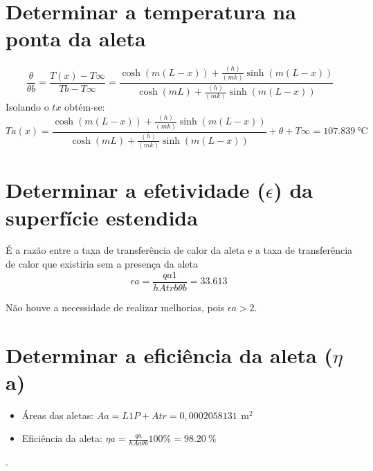 \section{Determinar a temperatura na ponta da aleta}\label{sec:C}
\begin{equation}
    {\frac{\theta}{{\theta}b}}=
    {\frac
    {T(x)-{T\infty}}
    {Tb-{T\infty}}
    }=
    {
    \frac
    {\cosh{(m(L-x))}+{\frac{(h)}{(mk)}}{\sinh{(m(L-x))}}}
    {\cosh{(mL)}+{\frac{(h)}{(mk)}}{\sinh{(m(L-x))}}}
    }
\end{equation}
Isolando o \(tx\) obtém-se:
\begin{equation}
    {Ta(x)}=
    {
    \frac
    {\cosh{(m(L-x))}+{\frac{(h)}{(mk)}}{\sinh{(m(L-x))}}}
    {\cosh{(mL)}+{\frac{(h)}{(mk)}}{\sinh{(m(L-x))}}}
    }+
    {\theta}+
    {T\infty}=
    \SI{107,839}{\degreeCelsius}
\end{equation}

\section{ Determinar a efetividade (\(\epsilon\)) da superfície estendida}\label{sec:d}
É a razão entre a taxa de transferência de calor da aleta e a taxa de
transferência de calor que existiria sem a presença da aleta
\begin{equation}
    {{\epsilon}a}=
        {
            \frac
            {{qa1}}
            {{h}{Atrb}{\theta}b}
        }=
        {\SI{33,613}{}}
\end{equation}
\par Não houve a necessidade de realizar melhorias, pois \({\epsilon}a>{2}\).

\section{Determinar a eficiência da aleta (\(\eta\)a)}\label{sec:e}

\begin{itemize}[leftmargin=2cm]
    \item Áreas das aletas: \(
          {Aa}={{L1}{P}+{Atr}} = 0,0002058131\,\SI{}{\square\meter}
          \)
    \item Eficiência da aleta: \(
          {\eta}a=
          {\frac{qa}{{h}{Aa}{\theta}b}}{100\%}=
          {\SI{98,20}{\percent}}
          \)
\end{itemize}.

